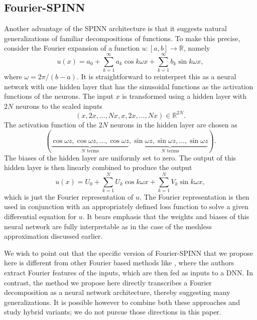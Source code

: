 \documentclass[12pt]{article}
\newcommand{\rr}[1]{#1}
\begin{document}
\subsection{Fourier-SPINN}
Another advantage of the SPINN architecture is that it suggests natural generalizations of familiar decompositions of functions. To make this precise, consider the Fourier expansion of a function $u:[a,b] \to \mathbb{R}$, namely
\begin{displaymath}
u(x) = a_0 + \sum_{k=1}^{\infty} a_k \cos k\omega x + \sum_{k=1}^{\infty} b_k \sin k\omega x,
\end{displaymath}
where $\omega = 2\pi/(b - a)$. It is straightforward to reinterpret this as a neural network with one hidden layer that has the sinusoidal functions as the activation functions of the neurons. The input $x$ is transformed using a hidden layer with $2N$ neurons to the scaled inputs
\begin{displaymath}
(x, 2x, \ldots, Nx, x, 2x, \ldots, Nx) \in \mathbb{R}^{2N}.
\end{displaymath}
The activation function of the $2N$ neurons in the hidden layer are chosen as
\begin{displaymath}
(\underbrace{\cos \omega z, \cos \omega z, \ldots, \cos \omega z}_{\text{$N$ terms}}, \underbrace{\sin \omega z, \sin \omega z, \ldots, \sin \omega z}_{\text{$N$ terms}}).
\end{displaymath}
The biases of the hidden layer are uniformly set to zero. The output of this hidden layer is then linearly combined to produce the output
\begin{displaymath}
u(x) = U_0 + \sum_{k=1}^N U_k \cos k\omega x + \sum_{k=1}^N V_k \sin k\omega x,
\end{displaymath}
which is just the Fourier representation of $u$. The Fourier representation is then used in conjunction with an appropriately defined loss function to solve a given differential equation for $u$. It bears emphasis that the weights and biases of this neural network are fully interpretable as in the case of the meshless approximation discussed earlier.

\rr{We wish to point out that the specific version of Fourier-SPINN that we propose here is different from other Fourier based methods like \cite{WANG2021113938, LPYWVJ21}, where the authors extract Fourier features of the inputs, which are then fed as inputs to a DNN. In contrast, the method we propose here directly transcribes a Fourier decomposition as a neural network architecture, thereby suggesting many generalizations. It is possible however to combine both these approaches and study hybrid variants; we do not pursue those directions in this paper.}
\end{document}
